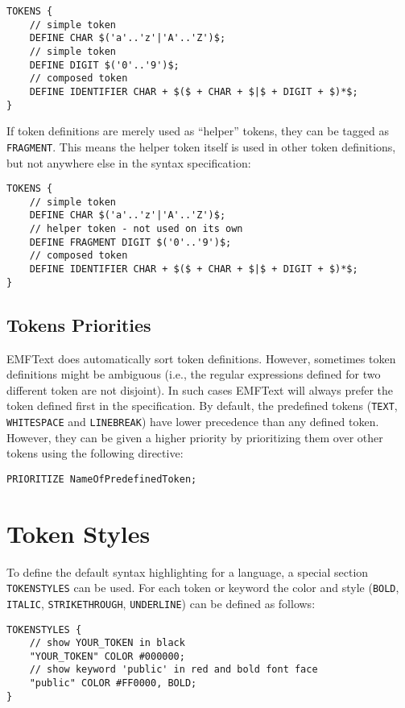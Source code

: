 \begin{lstlisting}
TOKENS {
    // simple token
    DEFINE CHAR $('a'..'z'|'A'..'Z')$;
    // simple token
    DEFINE DIGIT $('0'..'9')$;
    // composed token
    DEFINE IDENTIFIER CHAR + $($ + CHAR + $|$ + DIGIT + $)*$;
}
\end{lstlisting}

If token definitions are merely used as ``helper'' tokens, they can be tagged
as \texttt{FRAGMENT}. This means the helper token itself is used in other token
definitions, but not anywhere else in the syntax specification:

\begin{lstlisting}
TOKENS {
    // simple token
    DEFINE CHAR $('a'..'z'|'A'..'Z')$;
    // helper token - not used on its own
    DEFINE FRAGMENT DIGIT $('0'..'9')$;
    // composed token
    DEFINE IDENTIFIER CHAR + $($ + CHAR + $|$ + DIGIT + $)*$;
}
\end{lstlisting}

\subsection{Tokens Priorities}

EMFText does automatically sort token definitions. However, sometimes 
token definitions might be ambiguous (i.e., the regular expressions defined for
two different token are not disjoint). In such cases EMFText will always prefer
the token defined first in the specification. By default, the predefined tokens
(\texttt{TEXT}, \texttt{WHITESPACE} and \texttt{LINEBREAK}) have lower
precedence than any defined token. However, they can be given a higher priority
by prioritizing them over other tokens using the following directive:

\begin{lstlisting}
PRIORITIZE NameOfPredefinedToken;
\end{lstlisting}

\section{Token Styles}

To define the default syntax highlighting for a language, a special section
\texttt{TOKENSTYLES} can be used. For each token or keyword the color and
style (\texttt{BOLD}, \texttt{ITALIC}, \texttt{STRIKETHROUGH},
\texttt{UNDERLINE}) can be defined as follows:

\begin{lstlisting}
TOKENSTYLES {
    // show YOUR_TOKEN in black
    "YOUR_TOKEN" COLOR #000000;
    // show keyword 'public' in red and bold font face
    "public" COLOR #FF0000, BOLD;
}
\end{lstlisting}

